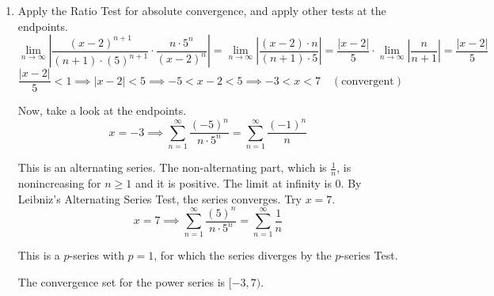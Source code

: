 \documentclass[a4paper, 12pt]{article}
\renewcommand{\headrulewidth}{0pt}
\renewcommand{\headrulewidth}{0pt}
\begin{document}
\begin{enumerate}[leftmargin=*,label=\textbf{\arabic*.}]
\item Apply the Ratio Test for absolute convergence, and apply other tests at the endpoints.
\[\lim_{n\to\infty}\left|\frac{(x-2)^{n+1}}{(n+1)\cdot(5)^{n+1}}\cdot\frac{n\cdot5^n}{(x-2)^n}\right|=\lim_{n\to\infty}\left|\frac{\left(x-2\right)\cdot n}{(n+1)\cdot5}\right|=\frac{|x-2|}5\cdot\lim_{n\to\infty}\left|\frac{n}{n+1}\right|=\frac{|x-2|}5\]
\[\frac{|x-2|}5<1\implies |x-2|<5\implies -5<x-2<5\implies -3<x<7 \quad (\text{convergent})\]

Now, take a look at the endpoints.
\[x=-3\implies \sum_{n=1}^{\infty}\frac{(-5)^n}{n\cdot5^n}=\sum_{n=1}^{\infty}\frac{(-1)^n}n\]

This is an alternating series. The non-alternating part, which is $\frac1n$, is nonincreasing for $n\geq1$ and it is positive. The limit at infinity is $0$. By Leibniz's Alternating Series Test, the series converges. Try $x=7$.
\[x=7\implies\sum_{n=1}^{\infty}\frac{(5)^n}{n\cdot5^n}=\sum_{n=1}^{\infty}\frac1n\]

This is a $p$-series with $p=1$, for which the series diverges by the $p$-series Test.

The convergence set for the power series is $\boxed{[-3,7)}$.

\end{enumerate}

\newpage
{}
{}

\newpage
\pagestyle{fancy}
\renewcommand{\headrulewidth}{1pt}

\end{document}

